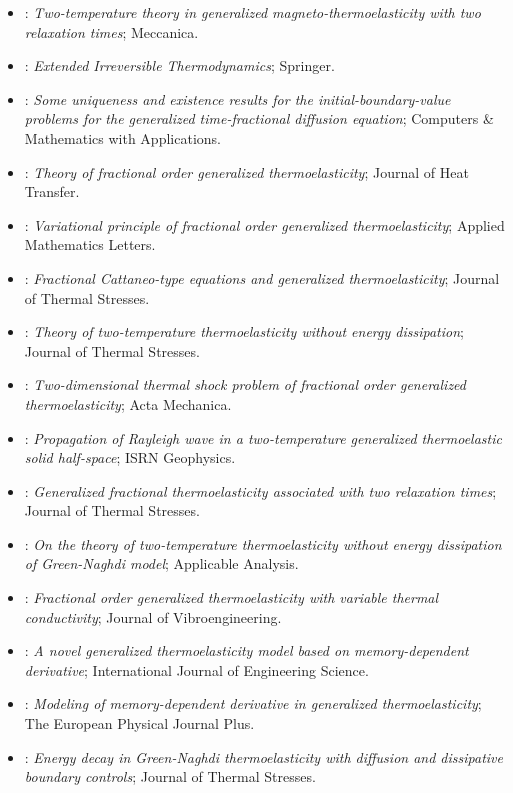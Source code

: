 \begin{itemize}
\item \citet{Ezzat2010}: \emph{Two-temperature theory in generalized magneto-thermoelasticity with two relaxation times}; Meccanica.
\item \citet{Jou2010}: \emph{Extended Irreversible Thermodynamics}; Springer.
\item \citet{Luchko2010}: \emph{Some uniqueness and existence results for the initial-boundary-value problems for the generalized time-fractional diffusion equation}; Computers \& Mathematics with Applications.
\item \citet{Youssef2010}: \emph{Theory of fractional order generalized thermoelasticity}; Journal of Heat Transfer.
\item \citet{Youssef2010a}: \emph{Variational principle of fractional order generalized thermoelasticity}; Applied Mathematics Letters.
\item \citet{Povstenko2011Cattaneo}: \emph{Fractional Cattaneo-type equations and generalized thermoelasticity}; Journal of Thermal Stresses.
\item \citet{Youssef2011}: \emph{Theory of two-temperature thermoelasticity without energy dissipation}; Journal of Thermal Stresses.
\item \citet{Youssef2012}: \emph{Two-dimensional thermal shock problem of fractional order generalized thermoelasticity}; Acta Mechanica.
\item \citet{Singh2013}: \emph{Propagation of Rayleigh wave in a two-temperature generalized thermoelastic solid half-space}; ISRN Geophysics.
\item \citet{Hamza2014}: \emph{Generalized fractional thermoelasticity associated with two relaxation times}; Journal of Thermal Stresses.
\item \citet{Youssef2014}: \emph{On the theory of two-temperature thermoelasticity without energy dissipation of Green-Naghdi model}; Applicable Analysis.
\item \citet{Youssef2014a}: \emph{Fractional order generalized thermoelasticity with variable thermal conductivity}; Journal of Vibroengineering.
\item \citet{Yu2014}: \emph{A novel generalized thermoelasticity model based on memory-dependent derivative}; International Journal of Engineering Science.
\item \citet{Ezzat2016}: \emph{Modeling of memory-dependent derivative in generalized thermoelasticity}; The European Physical Journal Plus.
\item \citet{Lazzari2016}: \emph{Energy decay in Green-Naghdi thermoelasticity with diffusion and dissipative boundary controls}; Journal of Thermal Stresses.

\end{itemize}
